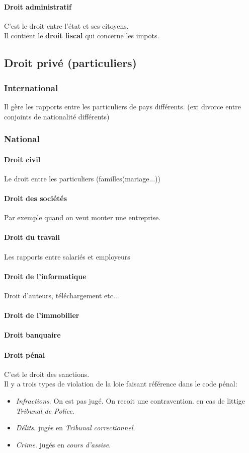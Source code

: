 \documentclass{article}
\begin{document}
				\paragraph{Droit administratif}
					C'est le droit entre l'état et ses citoyens.\\
					Il contient le \textbf{droit fiscal} qui concerne les impots.
		\subsection{Droit privé (particuliers)}
			\subsubsection{International}
				Il gère les rapports entre les particuliers de pays différents. (ex: divorce entre conjoints de nationalité différents)
			\subsubsection{National}
				\paragraph{Droit civil}
					Le droit entre les particuliers (familles(mariage...))
				\paragraph{Droit des sociétés}
					Par exemple quand on veut monter une entreprise.
				\paragraph{Droit du travail}
					Les rapports entre salariés et employeurs
				\paragraph{Droit de l'informatique}
					Droit d'auteurs, téléchargement etc...
				\paragraph{Droit de l'immobilier}
				\paragraph{Droit banquaire}
				\paragraph{Droit pénal}
					C'est le droit des sanctions.\\
					Il y a trois types de violation de la loie faisant référence dans le code pénal:
					\begin{itemize}
						\item \textit{Infractions}. On est pas jugé. On recoit une contravention. en cas de littige \textit{Tribunal de Police}.
						\item \textit{Délits}. jugés en \textit{Tribunal correctionnel}. 
						\item \textit{Crime}. jugés en \textit{cours d'assise}.
					\end{itemize}				
					
\end{document}
